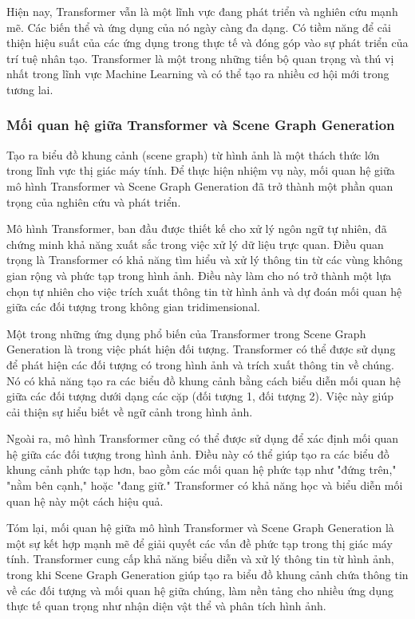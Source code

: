 \documentclass{article} %
\begin{document}
Hiện nay, Transformer vẫn là một lĩnh vực đang phát triển và nghiên cứu mạnh mẽ. Các biến thể và ứng dụng của nó ngày càng đa dạng. Có tiềm năng để cải thiện hiệu suất của các ứng dụng trong thực tế và đóng góp vào sự phát triển của trí tuệ nhân tạo. Transformer là một trong những tiến bộ quan trọng và thú vị nhất trong lĩnh vực Machine Learning và có thể tạo ra nhiều cơ hội mới trong tương lai.

\subsubsection{Mối quan hệ giữa Transformer và Scene Graph Generation}

Tạo ra biểu đồ khung cảnh (scene graph) từ hình ảnh là một thách thức lớn trong lĩnh vực thị giác máy tính. Để thực hiện nhiệm vụ này, mối quan hệ giữa mô hình Transformer và Scene Graph Generation đã trở thành một phần quan trọng của nghiên cứu và phát triển.

Mô hình Transformer, ban đầu được thiết kế cho xử lý ngôn ngữ tự nhiên, đã chứng minh khả năng xuất sắc trong việc xử lý dữ liệu trực quan. Điều quan trọng là Transformer có khả năng tìm hiểu và xử lý thông tin từ các vùng không gian rộng và phức tạp trong hình ảnh. Điều này làm cho nó trở thành một lựa chọn tự nhiên cho việc trích xuất thông tin từ hình ảnh và dự đoán mối quan hệ giữa các đối tượng trong không gian tridimensional.

Một trong những ứng dụng phổ biến của Transformer trong Scene Graph Generation là trong việc phát hiện đối tượng. Transformer có thể được sử dụng để phát hiện các đối tượng có trong hình ảnh và trích xuất thông tin về chúng. Nó có khả năng tạo ra các biểu đồ khung cảnh bằng cách biểu diễn mối quan hệ giữa các đối tượng dưới dạng các cặp (đối tượng 1, đối tượng 2). Việc này giúp cải thiện sự hiểu biết về ngữ cảnh trong hình ảnh.

Ngoài ra, mô hình Transformer cũng có thể được sử dụng để xác định mối quan hệ giữa các đối tượng trong hình ảnh. Điều này có thể giúp tạo ra các biểu đồ khung cảnh phức tạp hơn, bao gồm các mối quan hệ phức tạp như "đứng trên," "nằm bên cạnh," hoặc "đang giữ." Transformer có khả năng học và biểu diễn mối quan hệ này một cách hiệu quả.

Tóm lại, mối quan hệ giữa mô hình Transformer và Scene Graph Generation là một sự kết hợp mạnh mẽ để giải quyết các vấn đề phức tạp trong thị giác máy tính. Transformer cung cấp khả năng biểu diễn và xử lý thông tin từ hình ảnh, trong khi Scene Graph Generation giúp tạo ra biểu đồ khung cảnh chứa thông tin về các đối tượng và mối quan hệ giữa chúng, làm nền tảng cho nhiều ứng dụng thực tế quan trọng như nhận diện vật thể và phân tích hình ảnh.
\end{document}
